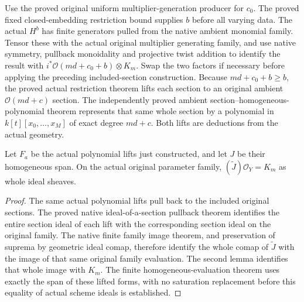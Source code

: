 Use the proved original uniform multiplier-generation producer for $c_0$.
The proved fixed closed-embedding restriction bound supplies $b$ before
all varying data.  The actual $H^b$ has finite generators pulled from the
native ambient monomial family.  Tensor these with the actual original
multiplier generating family, and use native symmetry, pullback
monoidality and projective twist addition to identify the result with
$i^*\mathcal O(md+c_0+b)\otimes K_m$.  Swap the two factors if necessary
before applying the preceding included-section construction.  Because
$md+c_0+b\geq b$, the proved actual restriction theorem lifts each section
to an original ambient $\mathcal O(md+c)$ section.  The independently
proved ambient section--homogeneous-polynomial theorem represents that
same whole section by a polynomial in $k[t][x_0,\ldots,x_M]$ of exact
degree $md+c$.  Both lifts are deductions from the actual geometry.


\begin{lemma}
\label{lem:c0n-cone-generators-polynomial-whole-ideal}
\leanok
Let $F_a$ be the actual polynomial lifts just constructed, and let $J$
be their homogeneous span.  On the actual original parameter family,
$(\widetilde J)\mathcal O_Y=K_m$ as whole ideal sheaves.
\end{lemma}
\begin{proof}
The same actual polynomial lifts pull back to the included original
sections.  The proved native ideal-of-a-section pullback theorem
identifies the entire section ideal of each lift with the corresponding
section ideal on the original family.  The native finite family
image theorem, and preservation of suprema by geometric ideal comap,
therefore identify the whole comap of $\widetilde J$ with the image of
that same original family evaluation.  The second lemma identifies that
whole image with $K_m$.  The finite homogeneous-evaluation theorem uses
exactly the span of these lifted forms, with no saturation replacement
before this equality of actual scheme ideals is established.
\end{proof}

